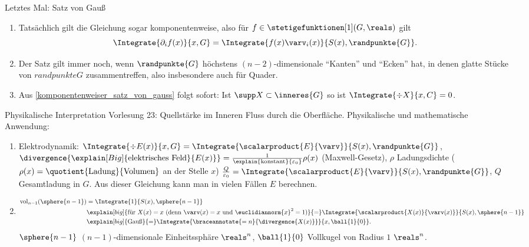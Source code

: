 Letztes Mal: Satz von Gauß
\begin{bemerkungen*}
  \begin{enumerate}[label=\rechtsklammer{\arabic*}, ref=Bemerkung \rechtsklammer{\arabic*}]
    \item \label{komponentenweiser_satz_von_gauss}Tatsächlich gilt die Gleichung sogar komponentenweise, also für \( f\in \stetigefunktionen[1](G,\reals) \) gilt
    \begin{equation*}
      \Integrate{\partial_i f(x)}{x,G}=\Integrate{f(x) \varv_i(x)}{S(x),\randpunkte{G}}.
    \end{equation*}
    \item Der Satz gilt immer noch, wenn \( \randpunkte{G} \) höchstens \( (n-2) \)-dimensionale \enquote{Kanten} und \enquote{Ecken} hat, in denen glatte Stücke von \( randpunkte{G} \) zusammentreffen, also insbesondere auch für Quader.
    \item Aus \ref{komponentenweiser_satz_von_gauss} folgt sofort: Ist \( \supp X\subset \inneres{G} \) so ist \( \Integrate{\div X}{x,C}=0 \).
  \end{enumerate}
\end{bemerkungen*}
Physikalische Interpretation \tto Vorlesung 23: Quellstärke im Inneren \teq Fluss durch die Oberfläche. Physikalische und mathematische Anwendung:
\begin{beispiele}
  \begin{enumerate}
    \item Elektrodynamik: \( \Integrate{\div E(x)}{x,G} =\Integrate{\scalarproduct{E}{\varv}}{S(x),\randpunkte{G}} \), \( \divergence{\explain[Big]{\text{elektrisches Feld}}{E(x)}}=\frac{1}{\explain{\text{konstant}}{\varepsilon_0}}\rho(x) \) (Maxwell-Gesetz), \( \rho \) Ladungsdichte (\( \rho(x) =\quotient{\text{Ladung}}{\text{Volumen}}\) an der Stelle \( x \)) \timplies \( \frac{Q}{\varepsilon_0}=\Integrate{\scalarproduct{E}{\varv}}{S(x),\randpunkte{G}} \), \( Q \) \teq Gesamtladung in \( G \). Aus dieser Gleichung kann man in vielen Fällen \( E \) berechnen.
    \item \begin{align*}
      \operatorname{vol}_{n-1}(\sphere{n-1})&=\Integrate{1}{S(x),\sphere{n-1}}\\
      &\explain[big]{\text{für \( X(x)=x \) (denn \( \varv(x)=x \) und \( \euclidiannorm{x}^2=1 \))}}{=}\Integrate{\scalarproduct{X(x)}{\varv(x)}}{S(x),\sphere{n-1}}\\
      &\explain[big]{\text{Gauß}}{=}\Integrate{\braceannotate{=n}{\divergence{X(x)}}}{x,\ball{1}{0}}.
    \end{align*}
    \( \sphere{n-1} \) \( (n-1) \)-dimensionale Einheitssphäre \tsubset \( \reals^n \), \( \ball{1}{0} \) Vollkugel von Radius \( 1 \) \tsubset \( \reals^n \).
  \end{enumerate}
\end{beispiele}
